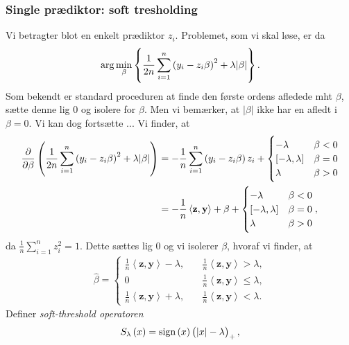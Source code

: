 \subsubsection{Single prædiktor: soft tresholding}
Vi betragter blot en enkelt prædiktor \(z_i\). 
Problemet, som vi skal løse, er da
\begin{align*}
\arg \min_{\beta} \cbr{\frac{1}{2n} \sum_{i=1}^n \del{y_i - z_{i} \beta}^2 + \lambda \vert \beta \vert}.
\end{align*}
Som bekendt er standard proceduren at finde den første ordens afledede mht $\beta$, sætte denne lig 0 og isolere for $\beta$. 
Men vi bemærker, at \(\vert \beta \vert \) ikke har en afledt i $\beta=0$.
Vi kan dog fortsætte ...
Vi finder, at
\begin{align*}
\frac{\partial}{\partial \beta} \del{\frac{1}{2n} \sum_{i=1}^n \del{y_i - z_{i} \beta}^2 + \lambda \vert \beta \vert}
&= -\frac{1}{n} \sum_{i=1}^n \del{y_i - z_{i} \beta} z_i + \begin{cases}
-\lambda \quad &\beta < 0 \\
[-\lambda, \lambda] & \beta = 0 \\
\lambda & \beta >0 
\end{cases}  \\
&= -\frac{1}{n} \left\langle \mathbf{z}, \mathbf{y} \right\rangle + \beta + \begin{cases}
-\lambda \quad &\beta < 0 \\
[-\lambda, \lambda] & \beta = 0 \\
\lambda & \beta >0 
\end{cases},
\end{align*}
da $\frac{1}{n} \sum_{i=1}^n z_i^2=1$. Dette sættes lig 0 og vi isolerer $\beta$, hvoraf vi finder, at
\begin{align}
\hat{\beta} = \begin{cases}
\frac{1}{n} \left\langle \mathbf{z}, \mathbf{y} \right\rangle - \lambda, \quad &\frac{1}{n} \left\langle \mathbf{z}, \mathbf{y} \right\rangle > \lambda, \\
0 &\frac{1}{n} \left\langle \mathbf{z}, \mathbf{y} \right\rangle \leq \lambda, \\
\frac{1}{n} \left\langle \mathbf{z}, \mathbf{y} \right\rangle + \lambda, &\frac{1}{n} \left\langle \mathbf{z}, \mathbf{y} \right\rangle < \lambda.
\end{cases} \label{eq:2.10}
\end{align}
Definer \textit{soft-threshold operatoren}
\begin{align*}
S_\lambda\del{x}=\text{sign}\del{x} \del{\vert x \vert - \lambda}_+,
\end{align*}
